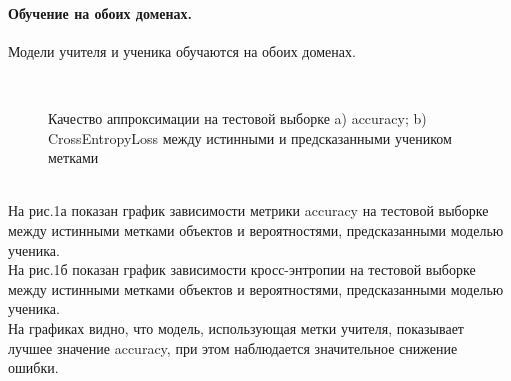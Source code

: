 \paragraph{Обучение на обоих доменах.}
Модели учителя и ученика обучаются на обоих доменах.\\
\begin{figure}[h!t]\center
{}
\\
\caption{Качество аппроксимации на тестовой выборке a) accuracy; b) CrossEntropyLoss между истинными и предсказанными учеником метками}
\end{figure}\\
На рис.1а показан график зависимости метрики accuracy на тестовой выборке между истинными метками объектов и вероятностями, предсказанными моделью ученика.\\
На рис.1б показан график зависимости кросс-энтропии на тестовой выборке между истинными метками объектов и вероятностями, предсказанными моделью ученика.\\
На графиках видно, что модель, использующая метки учителя, показывает лучшее значение accuracy, при этом наблюдается значительное снижение ошибки.


